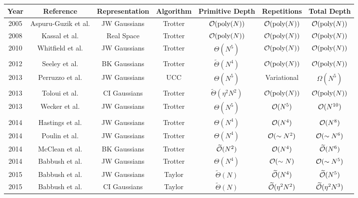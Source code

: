 \documentclass[superscriptaddress,aps,pra,nofootinbib,notitlepage,10pt,longbibliography]{revtex4-1}
\begin{document}
\begin{table*}[t]
\label{tab:scalings}
\begin{tabular}{c|c|c|c|c|c||c}
Year & Reference & Representation & Algorithm & Primitive Depth & Repetitions & Total Depth\\
\hline\hline
%
2005  & Aspuru-Guzik et al. \cite{Aspuru-Guzik2005}  & JW Gaussians & Trotter & ${\cal O}(\textrm{poly}(N))$ & ${\cal O}(\textrm{poly}(N))$ & ${\cal O}(\textrm{poly}(N))$\\
%
2008  & Kassal et al. \cite{Kassal2008}  & Real Space & Trotter & ${\cal O}(\textrm{poly}(N))$ & ${\cal O}(\textrm{poly}(N))$ & ${\cal O}(\textrm{poly}(N))$\\
%
2010 & Whitfield et al. \cite{Whitfield2010} & JW Gaussians & Trotter & $\Theta(N^5)$ & ${\cal O}(\textrm{poly}(N))$ & ${\cal O}(\textrm{poly}(N))$ \\
%
2012 & Seeley et al. \cite{Seeley2012} & BK Gaussians & Trotter & $\widetilde{\Theta}(N^4)$ & ${\cal O}(\textrm{poly}(N))$ & ${\cal O}(\textrm{poly}(N))$ \\
%
2013 & Perruzzo et al. \cite{Peruzzo2013} & JW Gaussians & UCC & $\Theta(N^5)$ & Variational & $\Omega(N^5)$ \\
%
2013 & Toloui et al. \cite{Toloui2013} & CI Gaussians & Trotter & $\widetilde{\Theta}(\eta^2 N^2)$ & ${\cal O}(\textrm{poly}(N))$ & ${\cal O}(\textrm{poly}(N))$\\
%
2013 & Wecker et al. \cite{Wecker2014} & JW Gaussians & Trotter & $\Theta(N^5)$ & ${\cal O}(N^{5})$ & ${\cal O}(N^{10})$ \\
%
2014 & Hastings et al. \cite{Hastings2015} & JW Gaussians & Trotter & $\Theta(N^4)$ & ${\cal O}(N^4)$ & ${\cal O}(N^8)$\\
%
2014 & Poulin et al. \cite{Poulin2014} & JW Gaussians & Trotter & $\Theta(N^4)$ & $ {\cal O}(\sim N^2)$ & ${\cal O}(\sim N^6)$\\
%
2014 & McClean et al. \cite{McClean2014} & BK Gaussians & Trotter & $\widetilde{\cal O}(N^2)$ & ${\cal O}(N^4)$ & $\widetilde{\cal O}(N^6)$\\
%
2014 & Babbush et al. \cite{BabbushTrotter} & JW Gaussians & Trotter  & $\Theta(N^4)$ & ${\cal O}(\sim N)$ & ${\cal O}(\sim N^5)$ \\
%
2015 & Babbush et al. \cite{BabbushSparse1} & JW Gaussians & Taylor & $\widetilde{\Theta}(N)$ & $\widetilde{\cal O}(N^4)$ & $\widetilde{\cal O}(N^5)$  \\
%
2015 & Babbush et al. \cite{BabbushSparse2} & CI Gaussians & Taylor & $\widetilde{\Theta}(N)$ & $\widetilde{\cal O}(\eta^2 N^2)$ & $\widetilde{\cal O}(\eta^2 N^3)$ \\

\end{tabular}
\end{table*}
\end{document}

